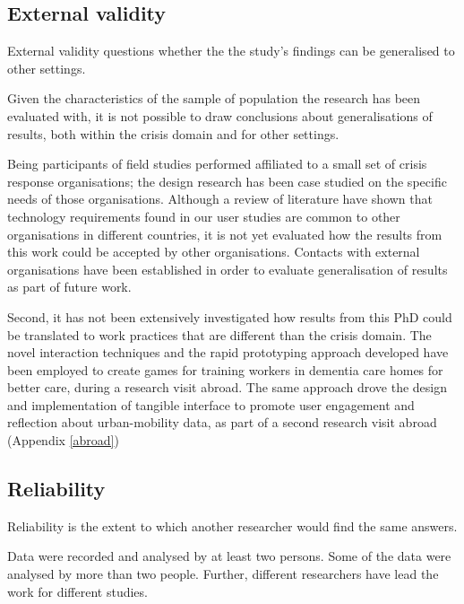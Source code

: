 \subsection{External validity}\label{external-validity}

External validity questions whether the the study's findings can be generalised to other settings.

Given the characteristics of the sample of population the research has been evaluated with, it is not possible to draw conclusions about generalisations of results, both within the crisis domain and for other settings.

Being participants of field studies performed affiliated to a small set of crisis response organisations; the design research has been case studied on the specific needs of those organisations. Although a review of literature have shown that technology requirements found in our user studies are common to other organisations in different countries, it is not yet evaluated how the results from this work could be accepted by other organisations. Contacts with external organisations have been established in order to evaluate generalisation of results as part of future work.

Second, it has not been extensively investigated how results from this PhD could be translated to work practices that are different than the crisis domain. The novel interaction techniques and the rapid prototyping approach developed have been employed to create games for training workers in dementia care homes for better care, during a research visit abroad. The same approach drove the design and implementation of tangible interface to promote user engagement and reflection about urban-mobility data, as part of a second research visit abroad (Appendix \ref{abroad})

\subsection{Reliability}\label{reliability}

Reliability is the extent to which another researcher would find the same answers.

Data were recorded and analysed by at least two persons. Some of the data were analysed by more than two people. Further, different researchers have lead the work for different studies. 
